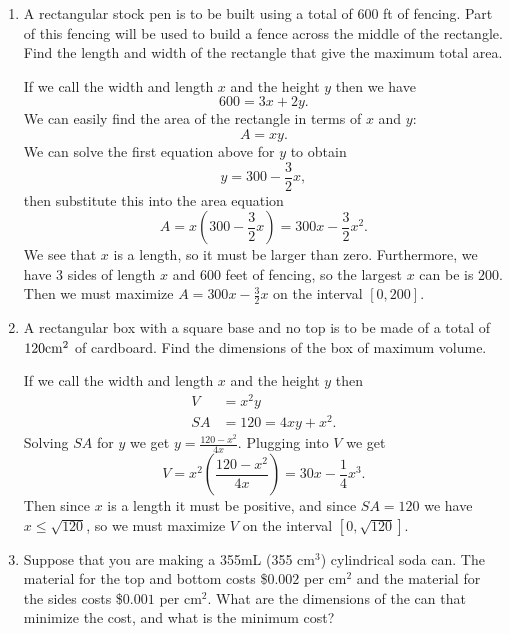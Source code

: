 \documentclass[11pt]{article}
\begin{document}
\drawtitle

\begin{enumerate}

\item A rectangular stock pen is to be built using a total of 600 ft
  of fencing. Part of this fencing will be used to build a fence
  across the middle of the rectangle. Find the length and width of the
  rectangle that give the maximum total area.

  \vfill
  {\color{blue}

    If we call the width and length $x$ and the height $y$ then we
    have
    \[
    600 = 3x + 2y.
    \]
    We can easily find the area of the rectangle in terms of $x$ and
    $y$:
    \[
    A = xy.
    \]
    We can solve the first equation above for $y$ to obtain
    \[
    y = 300 -\frac{3}{2} x,
    \]
    then substitute this into the area equation
    \[
    A = x\left(300-\frac{3}{2}x\right) = 300x - \frac{3}{2} x^2.
    \]
    We see that $x$ is a length, so it must be larger than
    zero. Furthermore, we have 3 sides of length $x$ and 600 feet of
    fencing, so the largest $x$ can be is $200$. Then we must maximize
    $A = 300x - \frac{3}{2} x$ on the interval $[0,200]$.

  }
  \vfill
  
  \newpage

\item A rectangular box with a square base and no top is to be made of
  a total of $120\rm{cm}^2$ of cardboard.  Find the dimensions of the
  box of maximum volume.

  \vfill
  {\color{blue}

    If we call the width and length $x$ and the height $y$ then
    \begin{align*}
      V &= x^2y\\
      SA &= 120 = 4xy + x^2.
    \end{align*}
    Solving $SA$ for $y$ we get $y=\frac{120-x^2}{4x}$.  Plugging into $V$
    we get
    \[
    V = x^2\left(\frac{120-x^2}{4x}\right) = 30x-\frac{1}{4}x^3.
    \]
    Then since $x$ is a length it must be positive, and since $SA=120$
    we have $x\leq \sqrt{120}$, so we must maximize $V$ on the
    interval $\left[0,\sqrt{120}\right]$.

  }
  \vfill

  \newpage
  
\item Suppose that you are making a 355mL (355 cm$^3$) cylindrical
  soda can.  The material for the top and bottom costs \$$0.002$ per
  cm$^2$ and the material for the sides costs \$$0.001$ per
  cm$^2$. What are the dimensions of the can that minimize the cost,
  and what is the minimum cost?


\end{enumerate}
\end{document}
